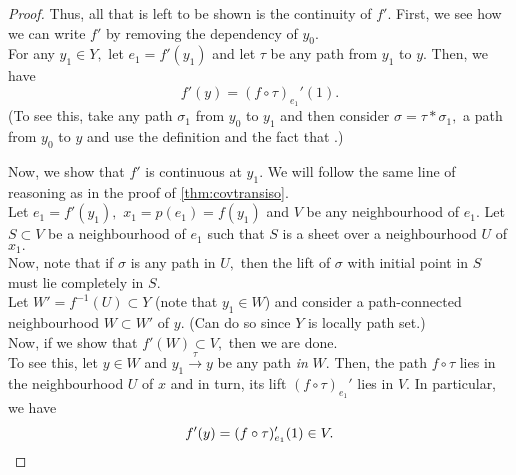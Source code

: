 \documentclass[12pt]{article}
\theoremstyle{definition}
\numberwithin{thm}{section}
\begin{document}
\begin{proof}
	Thus, all that is left to be shown is the continuity of $f'.$ First, we see how we can write $f'$ by removing the dependency of $y_0.$\\
	For any $y_1 \in Y,$ let $e_1 = f'(y_1)$ and let $\tau$ be any path from $y_1$ to $y.$ Then, we have
	\begin{equation*} 
		f'(y) = (f\circ\tau)_{e_1}'(1).
	\end{equation*}
	(To see this, take any path $\sigma_1$ from $y_0$ to $y_1$ and then consider $\sigma = \tau*\sigma_1,$ a path from $y_0$ to $y$ and use the definition and the fact that .)

	Now, we show that $f'$ is continuous at $y_1.$ We will follow the same line of reasoning as in the proof of \ref{thm:covtransiso}.\\
	Let $e_1 = f'(y_1),$ $x_1 = p(e_1) = f(y_1)$ and $V$ be any neighbourhood of $e_1.$ Let $S \subset V$ be a neighbourhood of $e_1$ such that $S$ is a sheet over a neighbourhood $U$ of $x_1.$ \\
	Now, note that if $\sigma$ is any path in $U,$ then the lift of $\sigma$ with initial point in $S$ must lie completely in $S.$\\
	Let $W' = f^{-1}(U) \subset Y$ (note that $y_1 \in W$) and consider a path-connected neighbourhood $W \subset W'$ of $y.$ (Can do so since $Y$ is locally path set.)\\
	Now, if we show that $f'(W) \subset V,$ then we are done.\\
	To see this, let $y \in W$ and $y_1 \overset{\tau}{\longrightarrow} y$ be any path \emph{in} $W.$ Then, the path $f\circ\tau$ lies in the neighbourhood $U$ of $x$ and in turn, its lift $(f\circ\tau)_{e_1}'$ lies in $V.$ In particular, we have
	\begin{equation*} 
		f'(y) = (f\circ\tau)_{e_1}'(1) \in V. \qedhere
	\end{equation*}
	
\end{proof}
\end{document}
